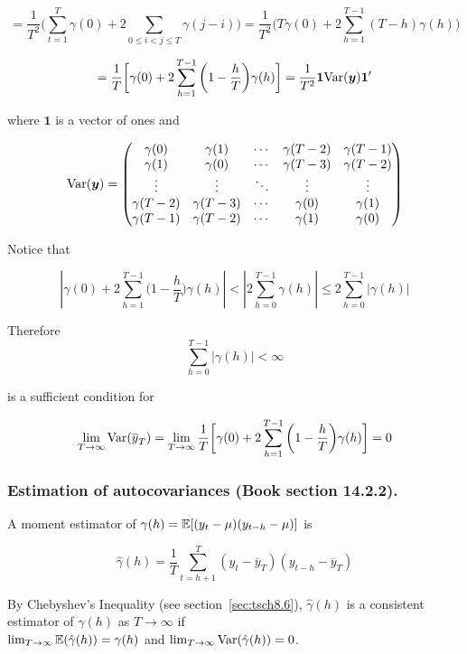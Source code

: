 \[
= \frac{1}{T^2} \bigg(\sum_{t=1}^T  \gamma(0) + 2 \sum_{0 \leq i < j \leq T } \gamma(j-i)  \bigg) = \frac{1}{T^2} \bigg( T  \gamma(0) + 2 \sum_{h = 1 }^{T-1} (T - h )\gamma(h)  \bigg)
\]

\[
= \frac{1}{T} \bigg[ \gamma(0) + 2 \sum_{h=1}^{T-1} \bigg(1 - \frac{h}{T} \bigg) \gamma(h) \bigg] = \frac{1}{T^2} \boldsymbol{1} \mathrm{Var}(\boldsymbol{y}) \boldsymbol{1}'
\]

where \(\boldsymbol{1}\) is a vector of ones and

\[
\mathrm{Var}(\boldsymbol{y}) = \begin{pmatrix} 
\gamma(0) &  \gamma(1) & \cdots  &  \gamma(T-2) & \gamma(T-1) \\
\gamma(1) &  \gamma(0) & \cdots  &  \gamma(T-3) & \gamma(T-2) \\
\vdots &  \vdots & \ddots  &  \vdots & \vdots \\
\gamma(T - 2) &  \gamma(T - 3) & \cdots  &  \gamma(0) & \gamma(1) \\
\gamma(T - 1) &  \gamma(T - 2) & \cdots  &  \gamma(1) & \gamma(0) 
\end{pmatrix} 
\]

Notice that

\[
\left| \gamma(0) + 2 \sum_{h=1}^{T-1} \bigg(1 - \frac{h}{T} \bigg) \gamma(h)  \right| < \left| 2 \sum_{h=0}^{T-1}\gamma(h) \right| \leq 2 \sum_{h=0}^{T-1} \left|  \gamma(h) \right| 
\]

Therefore
\[
\sum_{h=0}^{T-1} \left|  \gamma(h) \right| < \infty
\]

is a sufficient condition for 

\[
\lim_{T \to \infty} \mathrm{Var}(\overline{y}_T) = \lim_{T \to \infty}  \frac{1}{T} \bigg[ \gamma(0) + 2 \sum_{h=1}^{T-1} \bigg(1 - \frac{h}{T} \bigg) \gamma(h) \bigg]  = 0
\]

\subsubsection{Estimation of autocovariances (Book section 14.2.2).}
\label{sec:tsch14.2.2}

A moment estimator of \(\gamma(h) =  \mathbb{E}[(y_t - \mu)(y_{t-h} - \mu)]\) is

\[
\hat{\gamma}(h) = \frac{1}{T} \sum_{t=h+1}^T(y_t - \overline{y}_T)(y_{t-h} - \overline{y}_T)
\]

By Chebyshev's Inequality (see section~\ref{sec:tsch8.6}), \(\hat{\gamma}(h) \) is a consistent estimator of \(\gamma(h)\) as \(T \to \infty\) if \\ \(\lim_{T \to \infty} \mathbb{E}(\hat{\gamma}(h)) = \gamma(h)\) and \(\lim_{T \to \infty} \mathrm{Var}(\hat{\gamma}(h)) = 0\).

